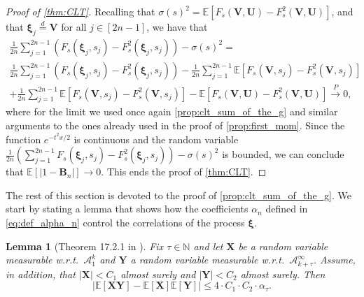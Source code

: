 \documentclass[11pt,a4paper,oneside]{article}
\newtheorem{lem}[thm]{Lemma}
\theoremstyle{definition}
\theoremstyle{remark}
\def\E{\mathbb{E}}
\begin{document}
\begin{proof}[Proof of \cref{thm:CLT}]
	Recalling that $\sigma(s)^2=\E\left[F_s(\bm V,\bm U)-F^2_s(\bm V,\bm U)\right]$, and that $\bm \xi_j\stackrel{d}{=}\bm V$ for all $j\in[2n-1]$, we have that
	\begin{multline}
		\frac{1}{{2n}}  \sum_{j=1}^{2n-1}  \left( F_s\left(\bm \xi_j,s_j \right) - F_s^2\left(\bm \xi_j,s_j \right) \right)  -   \sigma(s)^2
		=\\
		\frac{1}{{2n}}  \sum_{j=1}^{2n-1}  \left( F_s\left(\bm \xi_j,s_j \right) - F_s^2\left(\bm \xi_j,s_j \right) \right)
		-\frac{1}{{2n}}  \sum_{j=1}^{2n-1}  \E\left[ F_s\left(\bm V,s_j \right) - F_s^2\left( \bm V,s_j \right) \right]\\
		+\frac{1}{{2n}}  \sum_{j=1}^{2n-1}  \E\left[ F_s\left(\bm V,s_j \right) - F_s^2\left( \bm V,s_j \right) \right]
		-\E\left[F_s(\bm V,\bm U)-F^2_s(\bm V,\bm U)\right]   \xrightarrow{P} 0,
	\end{multline}
	where for the limit we used once again \cref{prop:clt_sum_of_the_g} and similar arguments to the ones already used in the proof of \cref{prop:first_mom}.
	Since the function $e^{-t^2x/2}$ is continuous and the random variable $\frac{1}{{2n}} \left( \sum_{j=1}^{2n-1}  F_s\left(\bm \xi_j,s_j \right) - F_s^2\left(\bm \xi_j,s_j \right) \right) -   \sigma(s)^2$ is bounded, we can conclude that $\E\left[|1-\bm B_n|\right]\to 0$. This ends the proof of \cref{thm:CLT}.
\end{proof}




The rest of this section is devoted to the proof of \cref{prop:clt_sum_of_the_g}. We start by stating a lemma that shows how the coefficients $\alpha_n$ defined in \cref{eq:def_alpha_n} control the correlations of the process $\bm \xi$. 
\begin{lem}[Theorem 17.2.1 in \cite{MR0322926}]\label{lem:decay_correlations}
	Fix $\tau \in \mathbb{N}$ and let $\bm X$ be a random variable measurable w.r.t.\ $\mathcal{A}_1^{k}$ and $\bm Y$ a random variable measurable w.r.t.\ $\mathcal{A}^{\infty}_{k + \tau}$. Assume, in addition, that $| \bm X | < C_1$ almost surely and $| \bm Y | < C_2$ almost surely. Then 
	\begin{equation}\label{eq:decay_correlations}
	\left|	\E \left[\bm X \bm Y\right] - \E [\bm X] \E[\bm Y]  \right| \leq 4 \cdot C_1 \cdot C_2 \cdot \alpha_{\tau}.
	\end{equation}
\end{lem}
\end{document}
